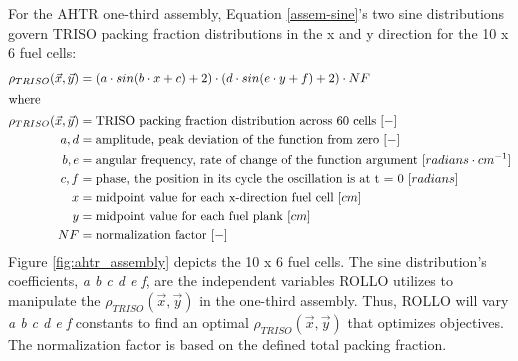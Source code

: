 For the \gls{AHTR} one-third assembly, Equation \ref{assem-sine}'s two sine 
distributions govern \gls{TRISO} packing fraction distributions in the x and y direction 
for the 10 x 6 fuel cells:
\begin{align}
    \label{assem-sine}
    \rho_{TRISO}(\vec{x}, \vec{y}) &= \left(a\cdot sin(b\cdot x + c) + 2\right) 
    \cdot \left(d\cdot sin(e\cdot y + f) + 2\right) \cdot NF \\
    \intertext{where}
    \rho_{TRISO}(\vec{x}, \vec{y}) &= \mbox{TRISO packing fraction distribution across 60 cells } [-] \nonumber \\ 
    a, d &= \mbox{amplitude, peak deviation of the function from zero } [-] \nonumber \\
    b, e &= \mbox{angular frequency, rate of change of the function argument } [radians \cdot cm^{-1}] \nonumber \\
    c, f &= \mbox{phase, the position in its cycle the oscillation is at t = 0 } [radians]\nonumber \\
    x &= \mbox{midpoint value for each x-direction fuel cell } [cm]\nonumber \\
    y &= \mbox{midpoint value for each fuel plank } [cm]\nonumber \\
    NF &= \mbox{normalization factor } [-]\nonumber
\end{align}
Figure \ref{fig:ahtr_assembly} depicts the 10 x 6 fuel cells.
The sine distribution's coefficients, \textit{a b c d e f}, are the independent variables 
\gls{ROLLO} utilizes to manipulate the $\rho_{TRISO}(\vec{x}, \vec{y})$ in the 
one-third assembly.
Thus, \gls{ROLLO} will vary \textit{a b c d e f} constants to find an optimal 
$\rho_{TRISO}(\vec{x}, \vec{y})$ that optimizes objectives.
The normalization factor is based on the defined total packing fraction.

